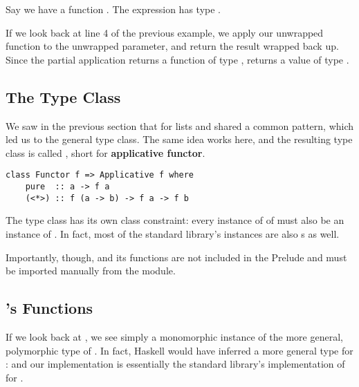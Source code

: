 Say we have a function . The expression  has type .

If we look back at line 4 of the previous example, we apply our unwrapped function to the unwrapped parameter, and return the
result wrapped back up. Since the partial application  returns a function of type , 
 returns a value of type . 

\subsection{The  Type Class}

We saw in the previous section that  for lists and  shared a common pattern, which led us to the
general  type class. The same idea works here, and the resulting type class is called , short for
\textbf{applicative functor}.

\begin{lstlisting}
class Functor f => Applicative f where
    pure  :: a -> f a
    (<*>) :: f (a -> b) -> f a -> f b
\end{lstlisting}

The  type class has its own class constraint: every instance of  of  must also
be an instance of . In fact, most of the standard library's  instances are also s
as well.

Importantly, though,  and its functions are not included in the Prelude and must be imported manually from
the  module.

\subsection{'s Functions}

If we look back at , we see simply
a monomorphic instance of the more general, polymorphic type of \code{(<*>)}. In fact, Haskell would have inferred a more
general type for :  and our implementation is essentially 
the standard library's implementation of \code{(<*>)} for .

